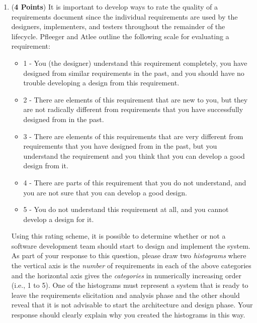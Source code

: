 \begin{enumerate}
\begin{enumerate}
\item ({\bf 4 Points}) It is important to develop ways to rate
  the quality of a requirements document since the individual
  requirements are used by the designers, implementers, and
  testers throughout the remainder of the lifecycle.  Pfleeger
  and Atlee outline the following scale for evaluating a
  requirement:

\renewcommand{\labelitemi}{$-$}

          \begin{itemize}

          \item 1 - You (the designer) understand this requirement
            completely, you have designed from similar requirements in
            the past, and you should have no trouble developing a
            design from this requirement.

          \item 2 - There are elements of this requirement that are
            new to you, but they are not radically different from
            requirements that you have successfully designed from in
            the past.

          \item 3 - There are elements of this requirements that are
            very different from requirements that you have designed
            from in the past, but you understand the requirement and
            you think that you can develop a good design from it.

          \item 4 - There are parts of this requirement that you do
            not understand, and you are not sure that you can develop
            a good design.

          \item 5 - You do not understand this requirement at all, and
            you cannot develop a design for it.

          \end{itemize}

          Using this rating scheme, it is possible to determine
          whether or not a software development team should start to
          design and implement the system.  As part of your response
          to this question, please draw two {\em histograms} where the
          vertical axis is the {\em number} of requirements in each of
          the above categories and the horizontal axis gives the {\em
            categories} in numerically increasing order (i.e., 1 to
          5).  One of the histograms must represent a system that is
          ready to leave the requirements elicitation and analysis
          phase and the other should reveal that it is not advisable
          to start the architecture and design phase.  Your response
          should clearly explain why you created the histograms in
          this way.

\end{enumerate}

\end{enumerate}





